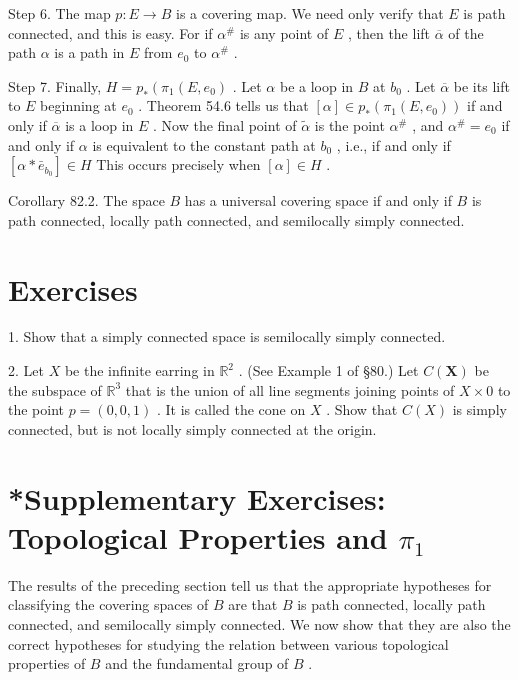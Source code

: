 \documentclass[10pt]{article}
\begin{document}
Step 6. The map \(p : E \rightarrow  B\) is a covering map. We need only verify that \(E\) is path connected, and this is easy. For if \({\alpha }^{\# }\) is any point of \(E\) , then the lift \(\overline{\alpha }\) of the path \(\alpha\) is a path in \(E\) from \({e}_{0}\) to \({\alpha }^{\# }\) .

Step 7. Finally, \(H = {p}_{ * }\left( {{\pi }_{1}\left( {E,{e}_{0}}\right) }\right.\) . Let \(\alpha\) be a loop in \(B\) at \({b}_{0}\) . Let \(\overline{\alpha }\) be its lift to \(E\) beginning at \({e}_{0}\) . Theorem 54.6 tells us that \(\left\lbrack  \alpha \right\rbrack   \in  {p}_{ * }\left( {{\pi }_{1}\left( {E,{e}_{0}}\right) }\right)\) if and only if \(\overline{\alpha }\) is a loop in \(E\) . Now the final point of \(\widetilde{\alpha }\) is the point \({\alpha }^{\# }\) , and \({\alpha }^{\# } = {e}_{0}\) if and only if \(\alpha\) is equivalent to the constant path at \({b}_{0}\) , i.e., if and only if \(\left\lbrack  {\alpha  * {\bar{e}}_{{b}_{0}}}\right\rbrack   \in  H\) This occurs precisely when \(\left\lbrack  \alpha \right\rbrack   \in  H\) .

Corollary 82.2. The space \(B\) has a universal covering space if and only if \(B\) is path connected, locally path connected, and semilocally simply connected.

\section*{Exercises}

1. Show that a simply connected space is semilocally simply connected.

2. Let \(X\) be the infinite earring in \({\mathbb{R}}^{2}\) . (See Example 1 of §80.) Let \(C\left( \mathbf{X}\right)\) be the subspace of \({\mathbb{R}}^{3}\) that is the union of all line segments joining points of \(X \times  0\) to the point \(p = \left( {0,0,1}\right)\) . It is called the cone on \(X\) . Show that \(C\left( X\right)\) is simply connected, but is not locally simply connected at the origin.

\section*{*Supplementary Exercises: Topological Properties and \({\pi }_{1}\)}

The results of the preceding section tell us that the appropriate hypotheses for classifying the covering spaces of \(B\) are that \(B\) is path connected, locally path connected, and semilocally simply connected. We now show that they are also the correct hypotheses for studying the relation between various topological properties of \(B\) and the fundamental group of \(B\) .
\end{document}
